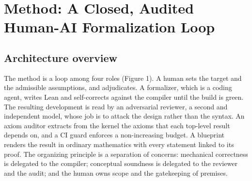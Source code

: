 \documentclass[11pt]{article}
\begin{document}
\section{Method: A Closed, Audited Human-AI Formalization Loop}

\subsection{Architecture overview}

The method is a loop among four roles (Figure 1). A human sets the target and the admissible
assumptions, and adjudicates. A formalizer, which is a coding agent, writes Lean and self-corrects
against the compiler until the build is green. The resulting development is read by an adversarial
reviewer, a second and independent model, whose job is to attack the design rather than the syntax.
An axiom auditor extracts from the kernel the axioms that each top-level result depends on, and a CI
guard enforces a non-increasing budget. A blueprint renders the result in ordinary mathematics with
every statement linked to its proof. The organizing principle is a separation of concerns:
mechanical correctness is delegated to the compiler; conceptual soundness is delegated to the
reviewer and the audit; and the human owns scope and the gatekeeping of premises.
\end{document}
